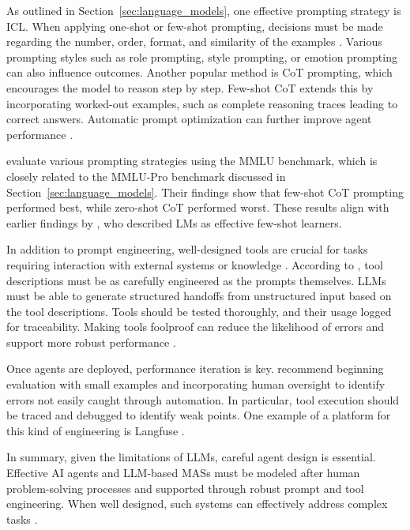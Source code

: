\documentclass[a4paper,oneside,bibliography=totoc]{scrbook}
\begin{document}
As outlined in Section~\ref{sec:language_models}, one effective prompting strategy is \ac{ICL}. When applying one-shot or few-shot prompting, decisions must be made regarding the number, order, format, and similarity of the examples \cite{Schulhoff2025}. Various prompting styles such as role prompting, style prompting, or emotion prompting can also influence outcomes. Another popular method is \ac{CoT} prompting, which encourages the model to reason step by step. Few-shot \ac{CoT} extends this by incorporating worked-out examples, such as complete reasoning traces leading to correct answers. Automatic prompt optimization can further improve agent performance \cite{Schulhoff2025}.

\citet{Schulhoff2025} evaluate various prompting strategies using the MMLU benchmark, which is closely related to the MMLU-Pro benchmark discussed in Section~\ref{sec:language_models}. Their findings show that few-shot \ac{CoT} prompting performed best, while zero-shot \ac{CoT} performed worst. These results align with earlier findings by \citet{Brown2020}, who described \acp{LM} as effective few-shot learners.

In addition to prompt engineering, well-designed tools are crucial for tasks requiring interaction with external systems or knowledge \cite{OpenAI2025,Anthropic2024}. According to \citet{Anthropic2024}, tool descriptions must be as carefully engineered as the prompts themselves. \acp{LLM} must be able to generate structured handoffs from unstructured input based on the tool descriptions. Tools should be tested thoroughly, and their usage logged for traceability. Making tools foolproof can reduce the likelihood of errors and support more robust performance \cite{Anthropic2024}.

Once agents are deployed, performance iteration is key. \citet{Hadfield2025} recommend beginning evaluation with small examples and incorporating human oversight to identify errors not easily caught through automation. In particular, tool execution should be traced and debugged to identify weak points. One example of a platform for this kind of engineering is Langfuse \cite{LGFT2025}.

In summary, given the limitations of \acp{LLM}, careful agent design is essential. Effective \ac{AI} agents and \ac{LLM}-based \acp{MAS} must be modeled after human problem-solving processes and supported through robust prompt and tool engineering. When well designed, such systems can effectively address complex tasks \cite{Hadfield2025}.
\end{document}
